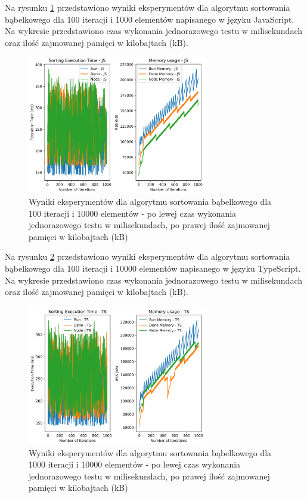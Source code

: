 Na rysunku \ref{fig:bubble_sorting_e4} przedstawiono wyniki eksperymentów dla algorytmu sortowania bąbelkowego dla 100 iteracji i 1000 elementów napisanego w języku JavaScript. Na wykresie przedstawiono czas wykonania jednorazowego testu w milisekundach oraz ilość zajmowanej pamięci w kilobajtach (kB).

\begin{figure}[H]
  \centering
  \includegraphics[width=0.7\textwidth]{Figures/sorting/sorting_bubble_1000_10000_js.png}
  \caption{Wyniki eksperymentów dla algorytmu sortowania bąbelkowego dla 100 iteracji i 10000 elementów - po lewej czas wykonania jednorazowego testu w milisekundach, po prawej ilość zajmowanej pamięci w kilobajtach (kB)}
  \label{fig:bubble_sorting_e4}
\end{figure}

Na rysunku \ref{fig:bubble_sorting_e4_ts} przedstawiono wyniki eksperymentów dla algorytmu sortowania bąbelkowego dla 100 iteracji i 10000 elementów napisanego w języku TypeScript. Na wykresie przedstawiono czas wykonania jednorazowego testu w milisekundach oraz ilość zajmowanej pamięci w kilobajtach (kB).

\begin{figure}[H]
  \centering
  \includegraphics[width=0.7\textwidth]{Figures/sorting/sorting_bubble_1000_10000_ts.png}
  \caption{Wyniki eksperymentów dla algorytmu sortowania bąbelkowego dla 1000 iteracji i 10000 elementów - po lewej czas wykonania jednorazowego testu w milisekundach, po prawej ilość zajmowanej pamięci w kilobajtach (kB)}
  \label{fig:bubble_sorting_e4_ts}
\end{figure}

